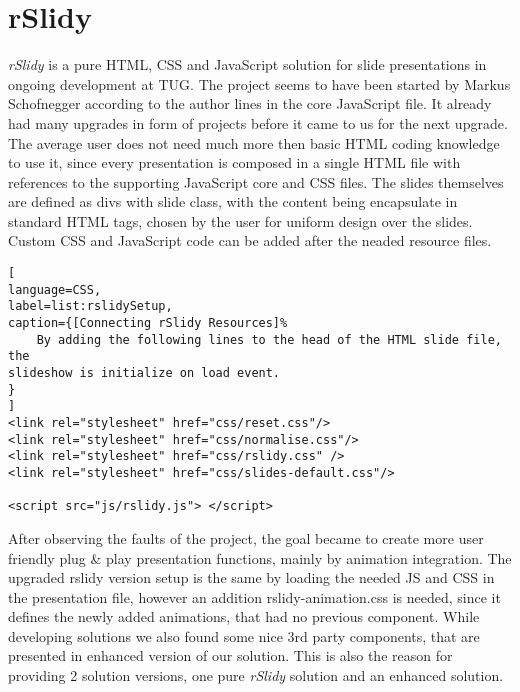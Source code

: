 %
%
% 
% 
% 


\chapter{rSlidy}

\label{chap:rslidy}

\textit{rSlidy} is a pure HTML, CSS and JavaScript solution for slide 
presentations in ongoing development at TUG. The project seems to have been 
started by Markus Schofnegger according to the author lines in the core 
JavaScript file. It already had many upgrades in form of projects before it 
came to us for the next upgrade. The average user does not need much more then 
basic HTML coding knowledge to use it, since every presentation is composed in 
a single HTML file with references to the supporting JavaScript core and CSS 
files. The slides themselves are defined as divs with slide class, with the 
content being encapsulate in standard HTML tags, chosen by the user for uniform 
design over the slides. Custom CSS and JavaScript code can be added after the 
neaded resource files.

\begin{minipage}{\linewidth}
\begin{lstlisting}[
language=CSS,
label=list:rslidySetup,
caption={[Connecting rSlidy Resources]%
	By adding the following lines to the head of the HTML slide file, the 
slideshow is initialize on load event. 
}
]
<link rel="stylesheet" href="css/reset.css"/>
<link rel="stylesheet" href="css/normalise.css"/>
<link rel="stylesheet" href="css/rslidy.css" />
<link rel="stylesheet" href="css/slides-default.css"/>

<script src="js/rslidy.js"> </script>
\end{lstlisting}
\end{minipage}

After observing the faults of the project, the goal became to create more user 
friendly plug \& play presentation functions, mainly by animation integration. 
The upgraded rslidy version setup is the same by loading the needed JS and CSS 
in the presentation file, however an addition rslidy-animation.css is needed, 
since it defines the newly added animations, that had no previous component. 
While developing solutions we also found some nice 3rd party components, that 
are presented in enhanced version of our solution. This is also the reason for 
providing 2 solution versions, one pure \textit{rSlidy} solution and an 
enhanced solution.

